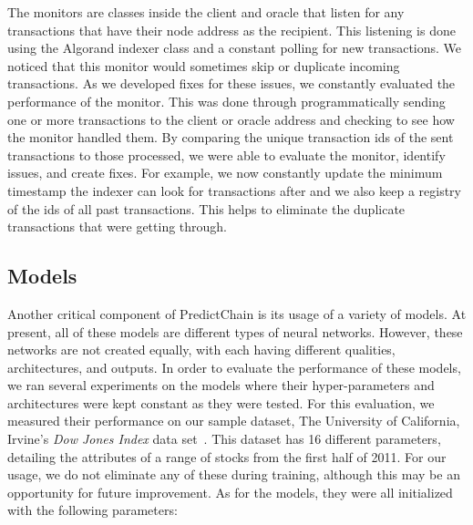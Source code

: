\documentclass{article}
\begin{document}
    The monitors are classes inside the client and oracle that listen for any transactions that have their node address
    as the recipient.  This listening is done using the Algorand indexer class and a constant polling for new transactions.
    We noticed that this monitor would sometimes skip or duplicate incoming transactions.  As we developed fixes for
    these issues, we constantly evaluated the performance of the monitor.  This was done through programmatically sending
    one or more transactions to the client or oracle address and checking to see how the monitor handled them.  By comparing
    the unique transaction ids of the sent transactions to those processed, we were able to evaluate the monitor,
    identify issues, and create fixes. For example, we now constantly update the minimum timestamp the indexer can look
    for transactions after and we also keep a registry of the ids of all past transactions.  This helps to eliminate
    the duplicate transactions that were getting through.

    \subsection{Models}

    Another critical component of PredictChain is its usage of a variety of models.  At present, all of these models
    are different types of neural networks.  However, these networks are not created equally, with each having different
    qualities, architectures, and outputs.  In order to evaluate the performance of these models, we ran several experiments
    on the models where their hyper-parameters and architectures were kept constant as they were tested.  For this
    evaluation, we measured their performance on our sample dataset, The University of California, Irvine's \textit{Dow Jones
    Index} data set~\cite{dowJones}.  This dataset has 16 different parameters, detailing the attributes of a range of
    stocks from the first half of 2011.  For our usage, we do not eliminate any of these during training, although this
    may be an opportunity for future improvement.  As for the models, they were all initialized with the following parameters:
\end{document}

